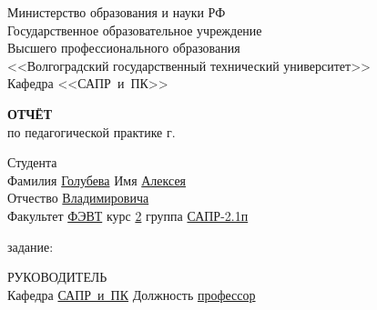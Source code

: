 \documentclass[a4paper, 14pt]{extreport}
\begin{document}
    \begin{titlepage}
        \begin{center}
            Министерство образования и науки РФ \\
            Государственное образовательное учреждение\\
            Высшего профессионального образования\\
            <<Волгоградский государственный технический университет>>\\
            Кафедра <<САПР~и~ПК>>
        \end{center}
        \vspace{2.0cm}
        \begin{center}
            \large \textbf{ОТЧЁТ} \\
            по педагогической практике \the\year г.
        \end{center}
        \begin{flushleft}
            Студента\\
            Фамилия \underline{Голубева\hspace{3.1cm}} 
            Имя \underline{Алексея\hspace{2.1cm}}\\
            Отчество \underline{Владимировича\hspace{1.6cm}}\\
            Факультет \underline{ФЭВТ\hspace{3.45cm}} курс \underline{2\hspace{1.5cm}} 
            группа \underline{САПР-2.1п\hspace{1.9cm}}\\
        \end{flushleft}
        \vspace{1.0cm}
         задание: \underline{\hspace{22.3em}}\\
        \underline{\hspace{\textwidth}}
        \underline{\hspace{\textwidth}}
        \underline{\hspace{\textwidth}}
        \underline{\hspace{\textwidth}}
        \vspace{2.0cm}
        \begin{flushleft}
            РУКОВОДИТЕЛЬ\\
            Кафедра \underline{САПР~и~ПК\hspace{2.4cm}} Должность \underline{профессор\hspace{2.8em}} \\

\end{flushleft}
\end{titlepage}
\end{document}
